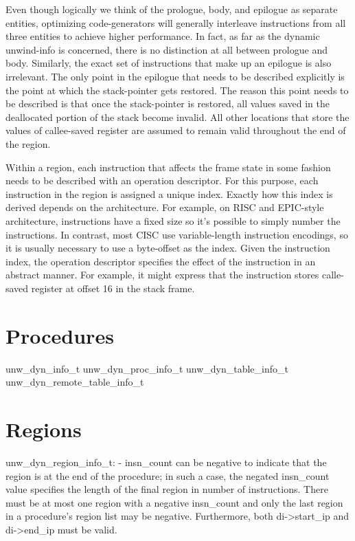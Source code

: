 \documentclass{article}
\begin{document}
Even though logically we think of the prologue, body, and epilogue as
separate entities, optimizing code-generators will generally
interleave instructions from all three entities to achieve higher
performance.  In fact, as far as the dynamic unwind-info is concerned,
there is no distinction at all between prologue and body.  Similarly,
the exact set of instructions that make up an epilogue is also
irrelevant.  The only point in the epilogue that needs to be described
explicitly is the point at which the stack-pointer gets restored.  The
reason this point needs to be described is that once the stack-pointer
is restored, all values saved in the deallocated portion of the stack
become invalid.  All other locations that store the values of
callee-saved register are assumed to remain valid throughout the end
of the region.

Within a region, each instruction that affects the frame state in some
fashion needs to be described with an operation descriptor.  For this
purpose, each instruction in the region is assigned a unique index.
Exactly how this index is derived depends on the architecture.  For
example, on RISC and EPIC-style architecture, instructions have a
fixed size so it's possible to simply number the instructions.  In
contrast, most CISC use variable-length instruction encodings, so it
is usually necessary to use a byte-offset as the index.  Given the
instruction index, the operation descriptor specifies the effect of
the instruction in an abstract manner.  For example, it might express
that the instruction stores calle-saved register  at offset 16
in the stack frame.

\section{Procedures}

unw\_dyn\_info\_t
unw\_dyn\_proc\_info\_t
unw\_dyn\_table\_info\_t
unw\_dyn\_remote\_table\_info\_t

\section{Regions}

unw\_dyn\_region\_info\_t:
        - insn_count can be negative to indicate that the region is
          at the end of the procedure; in such a case, the negated
          insn_count value specifies the length of the final region
          in number of instructions.  There must be at most one region
          with a negative insn_count and only the last region in a
          procedure's region list may be negative.  Furthermore, both
          di->start\_ip and di->end\_ip must be valid.
\end{document}
